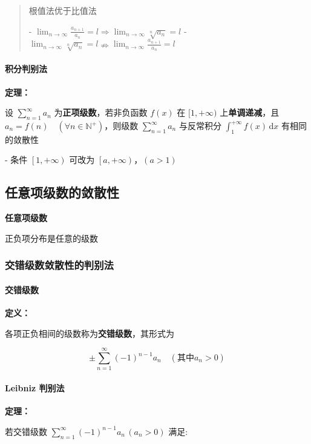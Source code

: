 \documentclass[lang = zh , final , oneside , openany , titlepage , zihao = -4 , linespread = 1.3 , baselineskip = false , cjk-font = windows , text-font = newtx , math-font = newtx]{sjtureport}
\begin{document}
\begin{quote}
根值法优于比值法

- \(\lim_{n\to\infty}\frac{a_{n + 1}}{a_n} =  l \Rightarrow \lim_{n\to\infty}\sqrt[n]{a_n} = l\)
- \(\lim_{n\to\infty}\sqrt[n]{a_n} = l \nRightarrow \lim_{n\to\infty}\frac{a_{n + 1}}{a_n} =  l\)
\end{quote}

\paragraph{积分判别法}

\textbf{定理：}

设 \(\sum_{n = 1}^\infty a_n\) 为\textbf{正项级数}，若非负函数 \(f(x)\) 在 \([1,+\infty)\) 上\textbf{单调递减}，且 \(a_n = f(n)\quad \left(\forall n \in \mathbb{N}^+\right)\)，则级数 \(\sum_{n = 1}^\infty a_n\) 与反常积分 \(\int_1^{+\infty} f(x)\,\mathrm{d}x\) 有相同的敛散性

- 条件 \(\left[1,+\infty\right)\) 可改为 \(\left[a,+\infty\right)，(a > 1)\)

\subsection{任意项级数的敛散性}

\textbf{任意项级数}

正负项分布是任意的级数

\subsubsection{交错级数敛散性的判别法}

\paragraph{交错级数}

\textbf{定义：}

各项正负相间的级数称为\textbf{交错级数}，其形式为

\[
\pm\sum_{n = 1}^\infty (-1)^{n - 1}a_n \quad \left(\text{其中}a_n > 0\right)
\]

\paragraph{Leibniz 判别法}

\textbf{定理：}

若交错级数 \(\sum_{n = 1}^\infty (-1)^{n - 1}a_n \,\left(a_n > 0\right)\) 满足:
\end{document}
